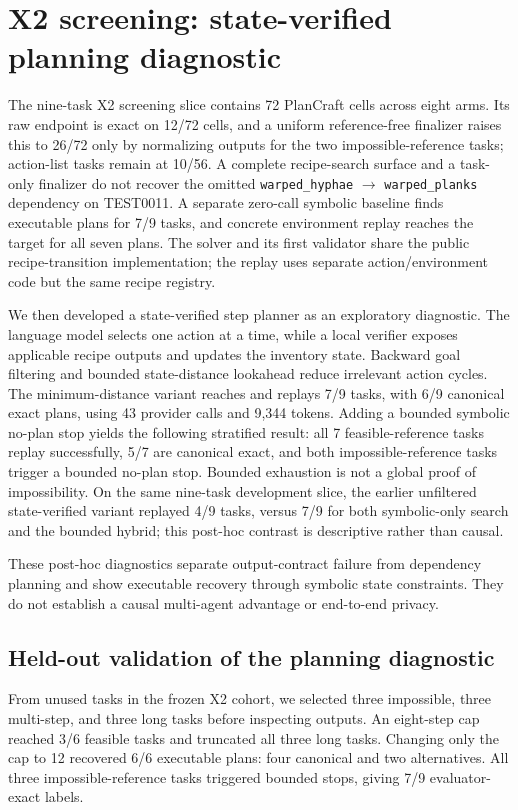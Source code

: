 \section{X2 screening: state-verified planning diagnostic}

The nine-task X2 screening slice contains 72 PlanCraft cells across eight arms. Its raw endpoint is exact on 12/72 cells, and a uniform reference-free finalizer raises this to 26/72 only by normalizing outputs for the two impossible-reference tasks; action-list tasks remain at 10/56. A complete recipe-search surface and a task-only finalizer do not recover the omitted \texttt{warped\_hyphae} $\rightarrow$ \texttt{warped\_planks} dependency on TEST0011. A separate zero-call symbolic baseline finds executable plans for 7/9 tasks, and concrete environment replay reaches the target for all seven plans. The solver and its first validator share the public recipe-transition implementation; the replay uses separate action/environment code but the same recipe registry.

We then developed a state-verified step planner as an exploratory diagnostic. The language model selects one action at a time, while a local verifier exposes applicable recipe outputs and updates the inventory state. Backward goal filtering and bounded state-distance lookahead reduce irrelevant action cycles. The minimum-distance variant reaches and replays 7/9 tasks, with 6/9 canonical exact plans, using 43 provider calls and 9,344 tokens. Adding a bounded symbolic no-plan stop yields the following stratified result: all 7 feasible-reference tasks replay successfully, 5/7 are canonical exact, and both impossible-reference tasks trigger a bounded no-plan stop. Bounded exhaustion is not a global proof of impossibility.
On the same nine-task development slice, the earlier unfiltered state-verified variant replayed 4/9 tasks, versus 7/9 for both symbolic-only search and the bounded hybrid; this post-hoc contrast is descriptive rather than causal.

These post-hoc diagnostics separate output-contract failure from dependency planning and show executable recovery through symbolic state constraints. They do not establish a causal multi-agent advantage or end-to-end privacy.

\subsection{Held-out validation of the planning diagnostic}

From unused tasks in the frozen X2 cohort, we selected three impossible, three multi-step, and three long tasks before inspecting outputs. An eight-step cap reached 3/6 feasible tasks and truncated all three long tasks. Changing only the cap to 12 recovered 6/6 executable plans: four canonical and two alternatives. All three impossible-reference tasks triggered bounded stops, giving 7/9 evaluator-exact labels.

